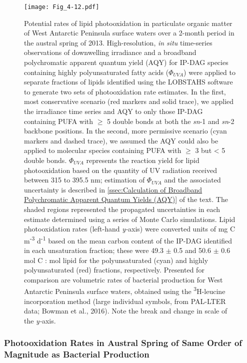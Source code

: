 \begin{figure}[!p]
\centering
\texttt{[image: Fig\_4-12.pdf]}
\caption[Potential rates of lipid photooxidation in particulate organic matter of West Antarctic Peninsula surface waters]{Potential rates of lipid photooxidation in particulate organic matter of West Antarctic Peninsula surface waters over a 2-month period in the austral spring of 2013. High-resolution, \emph{in situ} time-series observations of downwelling irradiance and a broadband polychromatic apparent quantum yield (AQY) for IP-DAG species containing highly polyunsaturated fatty acids (${\Phi _{UVA}}$) were applied to separate fractions of lipids identified using the LOBSTAHS software to generate two sets of photooxidation rate estimates. In the first, most conservative scenario (red markers and solid trace), we applied the irradiance time series and AQY to only those IP-DAG containing PUFA with $\geq$ 5 double bonds at both the \emph{sn}-1 and \emph{sn}-2 backbone positions. In the second, more permissive scenario (cyan markers and dashed trace), we assumed the AQY could also be applied to molecular species containing PUFA with $\geq$ 3 but \textless{} 5 double bonds. ${\Phi _{UVA}}$ represents the reaction yield for lipid photooxidation based on the quantity of UV radiation received between 315 to 395.5 nm; estimation of ${\Phi _{UVA}}$ and the associated uncertainty is described in \autoref{ssec:Calculation of Broadband Polychromatic Apparent Quantum Yields (AQY)} of the text. The shaded regions represented the propagated uncertainties in each estimate determined using a series of Monte Carlo simulations. Lipid photooxidation rates (left-hand \emph{y-}axis) were converted units of mg C m\textsuperscript{-3} d\textsuperscript{-1} based on the mean carbon content of the IP-DAG identified in each unsaturation fraction; these were 49.3 $\pm$ 0.5 and 50.6 $\pm$ 0.6 mol C : mol lipid for the polyunsaturated (cyan) and highly polyunsaturated (red) fractions, respectively. Presented for comparison are volumetric rates of bacterial production for West Antarctic Peninsula surface waters, obtained using the \textsuperscript{3}H-leucine incorporation method (large individual symbols, from PAL-LTER data; Bowman et al., 2016). Note the break and change in scale of the \emph{y-}axis.}
\label{fig:c4n12}
\end{figure}
\subsubsection{Photooxidation Rates in Austral Spring of Same Order of Magnitude as Bacterial Production}

